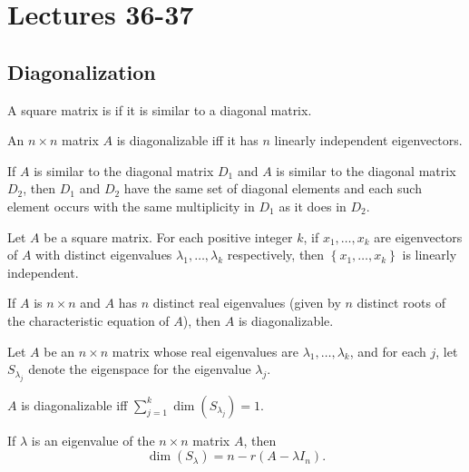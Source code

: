 \section{Lectures 36-37}
\subsection{Diagonalization}
\begin{definition}
  A square matrix is  if it is similar to a diagonal matrix.
\end{definition}

\begin{theorem}
  An $n \times n$ matrix $A$ is diagonalizable iff it has $n$ linearly independent eigenvectors.
\end{theorem}

\begin{theorem}
  If $A$ is similar to the diagonal matrix $D_{1}$ and $A$ is similar to the diagonal matrix $D_{2}$, then $D_{1}$ and $D_{2}$ have the same set of diagonal
  elements and each such element occurs with the same multiplicity in $D_{1}$ as it does in $D_{2}$.
\end{theorem}

\begin{theorem}
  Let $A$ be a square matrix. For each positive integer $k$, if $x_{1}, \dots, x_{k}$ are eigenvectors of $A$ with distinct eigenvalues $\lambda_{1}, \dots, \lambda_{k}$ 
  respectively, then $\left\{x_{1}, \dots, x_{k}\right\}$ is linearly independent.
\end{theorem}

\begin{corollary}
  If $A$ is $n \times n$ and $A$ has $n$ distinct real eigenvalues (given by $n$ distinct roots of the characteristic equation of $A$), then $A$ is diagonalizable.
\end{corollary}

\begin{theorem}
  Let $A$ be an $n \times n$ matrix whose real eigenvalues are $\lambda_{1}, \dots, \lambda_{k}$, and for each $j$,
  let $S_{\lambda_{j}}$ denote the eigenspace for the eigenvalue $\lambda_{j}$.

  $A$ is diagonalizable iff $\sum^{k}_{j = 1} \dim(S_{\lambda_{j}}) = 1$.
\end{theorem}

\begin{theorem}
  If $\lambda$ is an eigenvalue of the $n \times n$ matrix $A$, then 
  \begin{equation*}
    \dim(S_{\lambda}) = n - r(A - \lambda I_{n}).
  \end{equation*}
\end{theorem}
